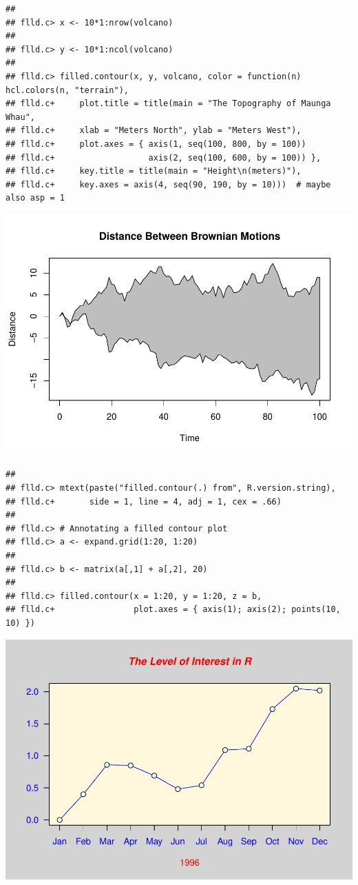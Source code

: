 \documentclass[
]{book}
\begin{document}
\begin{verbatim}
## 
## flld.c> x <- 10*1:nrow(volcano)
## 
## flld.c> y <- 10*1:ncol(volcano)
## 
## flld.c> filled.contour(x, y, volcano, color = function(n) hcl.colors(n, "terrain"),
## flld.c+     plot.title = title(main = "The Topography of Maunga Whau",
## flld.c+     xlab = "Meters North", ylab = "Meters West"),
## flld.c+     plot.axes = { axis(1, seq(100, 800, by = 100))
## flld.c+                   axis(2, seq(100, 600, by = 100)) },
## flld.c+     key.title = title(main = "Height\n(meters)"),
## flld.c+     key.axes = axis(4, seq(90, 190, by = 10)))  # maybe also asp = 1
\end{verbatim}

\includegraphics{TudodoR_files/figure-latex/unnamed-chunk-147-5.pdf}

\begin{verbatim}
## 
## flld.c> mtext(paste("filled.contour(.) from", R.version.string),
## flld.c+       side = 1, line = 4, adj = 1, cex = .66)
## 
## flld.c> # Annotating a filled contour plot
## flld.c> a <- expand.grid(1:20, 1:20)
## 
## flld.c> b <- matrix(a[,1] + a[,2], 20)
## 
## flld.c> filled.contour(x = 1:20, y = 1:20, z = b,
## flld.c+                plot.axes = { axis(1); axis(2); points(10, 10) })
\end{verbatim}

\includegraphics{TudodoR_files/figure-latex/unnamed-chunk-147-6.pdf}
\end{document}
